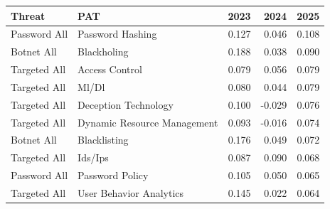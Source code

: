 \begin{tabular}{llrrr}
\toprule
Threat & PAT & 2023 & 2024 & 2025 \\
\midrule
Password  All & Password Hashing & 0.127 & 0.046 & 0.108 \\
Botnet All & Blackholing & 0.188 & 0.038 & 0.090 \\
Targeted  All & Access Control & 0.079 & 0.056 & 0.079 \\
Targeted  All & Ml/Dl & 0.080 & 0.044 & 0.079 \\
Targeted  All & Deception Technology & 0.100 & -0.029 & 0.076 \\
Targeted  All & Dynamic Resource Management & 0.093 & -0.016 & 0.074 \\
Botnet All & Blacklisting & 0.176 & 0.049 & 0.072 \\
Targeted  All & Ids/Ips & 0.087 & 0.090 & 0.068 \\
Password  All & Password Policy & 0.105 & 0.050 & 0.065 \\
Targeted  All & User Behavior Analytics & 0.145 & 0.022 & 0.064 \\
\bottomrule
\end{tabular}
